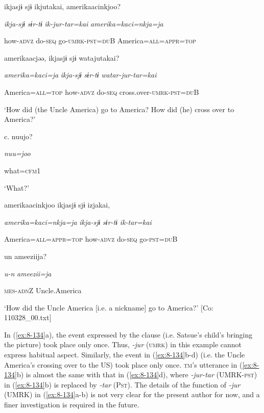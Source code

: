     {\TM}
\glll  ikjasjɨ  sjɨ  ikjutakai,  amerikaacinkjoo?

      \textit{ikja-sjɨ}  \textit{sɨr-tɨ}  \textit{ik-jur-tar=kai}  \textit{amerika=kaci=nkja=ja}

      how-\textsc{advz}  do-\textsc{seq}  go-\textsc{umrk}-\textsc{pst}=\textsc{du}B  America=\textsc{all}=\textsc{appr}=\textsc{top}

      amerikaacjəə,  ikjasjɨ  sjɨ  watajutakai?

      \textit{amerika=kaci=ja}  \textit{ikja-sjɨ}  \textit{sɨr-tɨ}  \textit{watar-jur-tar=kai}

      America=\textsc{all}=\textsc{top}  how-\textsc{advz}  do-\textsc{seq}  cross.over-\textsc{umrk}-\textsc{pst}=\textsc{du}B

\glt ‘How did (the Uncle America) go to America? How did (he) cross over to America?’

  c. {\US}
\glll   nuujo?

      \textit{nuu=joo}

      what=\textsc{cfm1}

\glt ‘What?’

\ex {\TM}
\glll  amerikaacinkjoo  ikjasjɨ  sjɨ  izjakai,

      \textit{amerika=kaci=nkja=ja}  \textit{ikja-sjɨ}  \textit{sɨr-tɨ}  \textit{ik-tar=kai}

      America=\textsc{all}=\textsc{appr}=\textsc{top}  how-\textsc{advz}  do-\textsc{seq}  go-\textsc{pst}=\textsc{du}B

      un  ameeziija?

      \textit{u-n}  \textit{ameezii=ja}

      \textsc{mes}-\textsc{adn}Z  Uncle.America

\glt ‘How did the Uncle America [i.e. a nickname] go to America?’ [Co: 110328\_00.txt]
\z

In (\ref{ex:8-134}a), the event expressed by the clause (i.e. Satsue’s child’s bringing the picture) took place only once. Thus, \textit{{}-jur} (\textsc{umrk}) in this example cannot express habitual aspect. Similarly, the event in (\ref{ex:8-134}b-d) (i.e. the Uncle America’s crossing over to the US) took place only once. \textsc{tm}’s utterance in (\ref{ex:8-134}b) is almost the same with that in (\ref{ex:8-134}d), where \textit{{}-jur-tar} (UMRK-\textsc{pst}) in (\ref{ex:8-134}b) is replaced by \textit{{}-tar} (P\textsc{st}). The details of the function of \textit{{}-jur} (UMRK) in (\ref{ex:8-134}a-b) is not very clear for the present author for now, and a finer investigation is required in the future.

